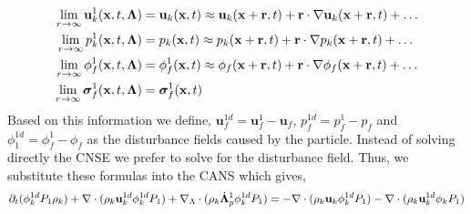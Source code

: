 \begin{align}
    \lim_{r \to \infty}  \textbf{u}_k^1(\textbf{x},t,\bm\Lambda)
    &= \textbf{u}_k(\textbf{x},t)
    \approx \textbf{u}_k(\textbf{x}+\textbf{r},t)
    + \textbf{r} \cdot \mathbf{\nabla} \textbf{u}_k(\textbf{x}+\textbf{r},t) 
    + \ldots\\
    \lim_{r \to \infty}  p_k^1(\textbf{x},t,\bm\Lambda)
    &= p_k(\textbf{x},t)
    \approx p_k(\textbf{x}+\textbf{r},t)
    + \textbf{r} \cdot \mathbf{\nabla} p_k(\textbf{x}+\textbf{r},t) 
    + \ldots\\
    \lim_{r \to \infty}  \phi_f^1(\textbf{x},t,\bm\Lambda)
    &= \phi_f^1(\textbf{x},t)
    \approx \phi_f(\textbf{x}+\textbf{r},t)
    + \textbf{r} \cdot \mathbf{\nabla} \phi_f(\textbf{x}+\textbf{r},t) 
    + \ldots\\
    \lim_{r \to \infty}  \bm\sigma_f^1(\textbf{x},t,\bm\Lambda)
    &= \bm\sigma_f^1(\textbf{x},t)
\end{align}
Based on this information we define, $\textbf{u}_f^{1d} = \textbf{u}_f^1 - \textbf{u}_f$, $p_f^{1d} = p_f^1 - p_f$ and $\phi_1^{1d} = \phi_f^1 - \phi_f$ as the disturbance fields caused by the particle. 
Instead of solving directly the CNSE we prefer to solve for the disturbance field. 
Thus, we substitute these formulas into the CANS which gives, 
\begin{equation}
    \partial_t ( \phi_k^{1d} P_1  \rho_k )
    + \mathbf{\nabla}\cdot (\rho_k  \textbf{u}_k^{1d} \phi_k^{1d} P_1 )
    +  \mathbf{\nabla}_\Lambda \cdot ( \rho_k \dot{\bm\Lambda}_p^1 \phi_k^{1d} P_1 )
    = 
    - \mathbf{\nabla}\cdot (\rho_k  \textbf{u}_k \phi_k^{1d} P_1 )
    - \mathbf{\nabla}\cdot (\rho_k  \textbf{u}_k^{1d} \phi_k P_1 )
\end{equation}
